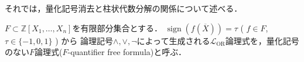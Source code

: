 \documentclass[uplatex, dvipdfmx]{jsarticle}
\makeatletter
\numberwithin{equation}{section}
\renewenvironment{proof}[1][\proofname]{\par
  \pushQED{\qed}%
  \normalfont \topsep6\p@\@plus6\p@\relax
  \trivlist
  \item\relax
  {\bfseries
  #1\@addpunct{.}}\hspace\labelsep\ignorespaces
}{
  \popQED\endtrivlist\@endpefalse
}
\newcommand{\Z}{\mathbb{Z}}
\newcommand{\map}[3]{{#1}\colon{#2}\rightarrow{#3}}
\DeclareMathOperator{\sign}{sign}
\DeclareMathOperator{\CSIGN}{CSIGN}
\theoremstyle{definition}
\newtheorem{definition}{定義}[section]
\newtheorem{proposition}[definition]{命題}
\renewcommand{\proofname}{\textbf{証明}}
\makeatother
\begin{document}





それでは，量化記号消去と柱状代数分解の関係について述べる．

$F \subset \Z[X_1, \dots, X_n]$を有限部分集合とする．
$\sign(f(\overline{X})) = \tau$ ( $f \in F$, $\tau \in \{-1, 0, 1\}$ ) から
論理記号$\land, \lor, \lnot$によって生成される$\mathcal{L}_\mathrm{OR}$論理式を，量化記号のない$F$論理式($F$-quantifier free formula)と呼ぶ．
\end{document}
